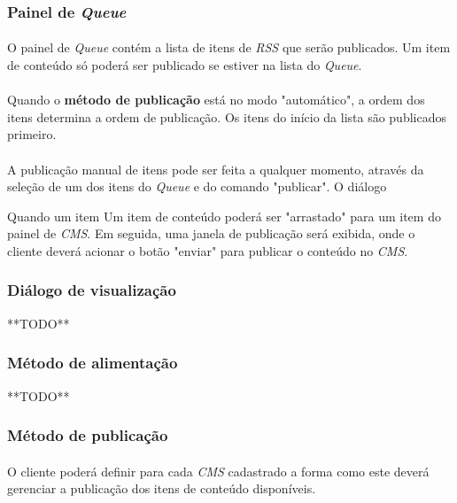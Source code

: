 \documentclass[a4paper,12pt]{article}
\def\cms{\emph{CMS}}
\def\rss{\emph{RSS}}
\def\queue{\emph{Queue}}
\begin{document}
\subsubsection{Painel de \queue{}}

\paragraph{}
O painel de \queue{} contém a lista de itens de \rss{} que serão publicados. Um
item de conteúdo só poderá ser publicado se estiver na lista do \queue{}.

\paragraph{}
Quando o \textbf{método de publicação} está no modo "automático", a ordem dos
itens determina a ordem de publicação. Os itens do início da lista são
publicados primeiro.

\paragraph{}
A publicação manual de itens pode ser feita a qualquer momento, através da seleção de um dos itens do \queue{} e do comando "publicar". O diálogo 

Quando um item 
Um item de conteúdo poderá ser "arrastado" para um item do painel de \cms{}. Em
seguida, uma janela de publicação será exibida, onde o cliente deverá acionar o
botão "enviar" para publicar o conteúdo no \cms{}.

\subsubsection{Diálogo de visualização}

**TODO**

\subsubsection{Método de alimentação}

**TODO**

\subsubsection{Método de publicação}

\paragraph{}
O cliente poderá definir para cada \cms{} cadastrado a forma como este deverá
gerenciar a publicação dos itens de conteúdo disponíveis.
\end{document}
